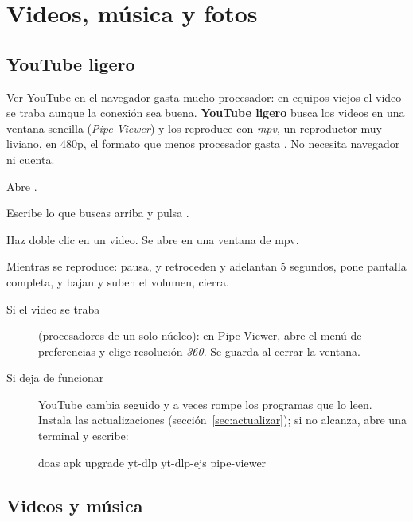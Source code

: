 \chapter{Videos, música y fotos}\label{cap:10-multimedia}

\section{YouTube ligero}\label{sec:youtube-ligero}

Ver YouTube en el navegador gasta mucho procesador: en equipos viejos el
video se traba aunque la conexión sea buena. \textbf{YouTube ligero}
busca los videos en una ventana sencilla (\emph{Pipe Viewer}) y los
reproduce con \emph{mpv}, un reproductor muy liviano, en 480p, el formato
que menos procesador gasta \cite{mpv,ytdlp}. No necesita navegador ni
cuenta.

\begin{pasos}
  \item Abre .
  \item Escribe lo que buscas arriba y pulsa .
  \item Haz doble clic en un video. Se abre en una ventana de mpv.
\end{pasos}


Mientras se reproduce:  pausa, \keys{\arrowkeyleft} y
\keys{\arrowkeyright} retroceden y adelantan 5 segundos,  pone
pantalla completa,  y  bajan y suben el volumen, 
cierra.

\begin{description}
  \item[Si el video se traba] (procesadores de un solo núcleo): en Pipe
    Viewer, abre el menú de preferencias y elige resolución \emph{360}. Se
    guarda al cerrar la ventana.
  \item[Si deja de funcionar] YouTube cambia seguido y a veces rompe los
    programas que lo leen. Instala las actualizaciones
    (sección~\ref{sec:actualizar}); si no alcanza, abre una terminal y
    escribe:
\begin{terminal}
doas apk upgrade yt-dlp yt-dlp-ejs pipe-viewer
\end{terminal}
\end{description}

\section{Videos y música}

